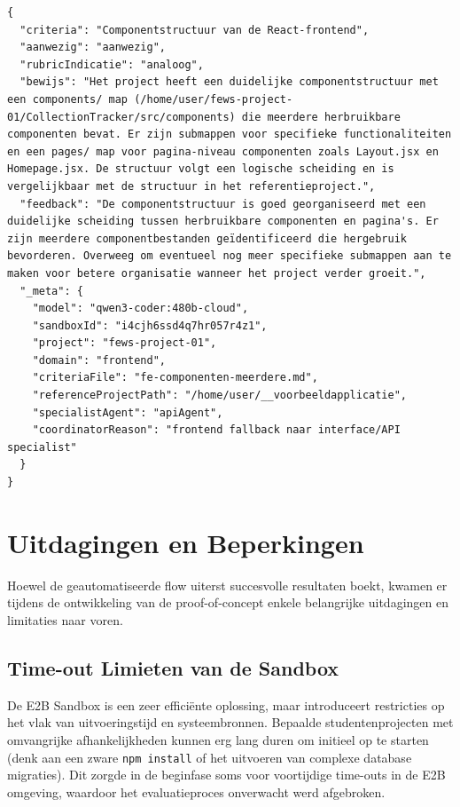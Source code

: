 \begin{listing}[htbp]
\begin{verbatim}
{
  "criteria": "Componentstructuur van de React-frontend",
  "aanwezig": "aanwezig",
  "rubricIndicatie": "analoog",
  "bewijs": "Het project heeft een duidelijke componentstructuur met een components/ map (/home/user/fews-project-01/CollectionTracker/src/components) die meerdere herbruikbare componenten bevat. Er zijn submappen voor specifieke functionaliteiten en een pages/ map voor pagina-niveau componenten zoals Layout.jsx en Homepage.jsx. De structuur volgt een logische scheiding en is vergelijkbaar met de structuur in het referentieproject.",
  "feedback": "De componentstructuur is goed georganiseerd met een duidelijke scheiding tussen herbruikbare componenten en pagina's. Er zijn meerdere componentbestanden geïdentificeerd die hergebruik bevorderen. Overweeg om eventueel nog meer specifieke submappen aan te maken voor betere organisatie wanneer het project verder groeit.",
  "_meta": {
    "model": "qwen3-coder:480b-cloud",
    "sandboxId": "i4cjh6ssd4q7hr057r4z1",
    "project": "fews-project-01",
    "domain": "frontend",
    "criteriaFile": "fe-componenten-meerdere.md",
    "referenceProjectPath": "/home/user/__voorbeeldapplicatie",
    "specialistAgent": "apiAgent",
    "coordinatorReason": "frontend fallback naar interface/API specialist"
  }
}
\end{verbatim}
\caption{Gegenereerde JSON-output van de specialist-agent, inclusief rubricIndicatie.}
\label{lst:criterium-json}
\end{listing}

\section{Uitdagingen en Beperkingen}

Hoewel de geautomatiseerde flow uiterst succesvolle resultaten boekt, kwamen er tijdens de ontwikkeling van de proof-of-concept enkele belangrijke uitdagingen en limitaties naar voren.

\subsection{Time-out Limieten van de Sandbox}
De E2B Sandbox is een zeer efficiënte oplossing, maar introduceert restricties op het vlak van uitvoeringstijd en systeembronnen. Bepaalde studentenprojecten met omvangrijke afhankelijkheden kunnen erg lang duren om initieel op te starten (denk aan een zware \texttt{npm install} of het uitvoeren van complexe database migraties). Dit zorgde in de beginfase soms voor voortijdige time-outs in de E2B omgeving, waardoor het evaluatieproces onverwacht werd afgebroken.

